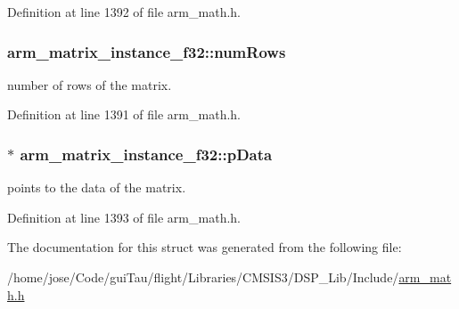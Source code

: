 Definition at line 1392 of file arm\-\_\-math.\-h.

\hypertarget{structarm__matrix__instance__f32_a23f4e34d70a82c9cad7612add5640b7b}{
\subsubsection[{num\-Rows}]{ arm\-\_\-matrix\-\_\-instance\-\_\-f32\-::num\-Rows}}\label{structarm__matrix__instance__f32_a23f4e34d70a82c9cad7612add5640b7b}
number of rows of the matrix. 

Definition at line 1391 of file arm\-\_\-math.\-h.

\hypertarget{structarm__matrix__instance__f32_af3917c032600a9dfd5ed4a96f074910a}{
\subsubsection[{p\-Data}]{$\ast$ arm\-\_\-matrix\-\_\-instance\-\_\-f32\-::p\-Data}}\label{structarm__matrix__instance__f32_af3917c032600a9dfd5ed4a96f074910a}
points to the data of the matrix. 

Definition at line 1393 of file arm\-\_\-math.\-h.



The documentation for this struct was generated from the following file\-:\begin{DoxyCompactItemize}
\item 
/home/jose/\-Code/gui\-Tau/flight/\-Libraries/\-C\-M\-S\-I\-S3/\-D\-S\-P\-\_\-\-Lib/\-Include/\hyperlink{arm__math_8h}{arm\-\_\-math.\-h}\end{DoxyCompactItemize}
